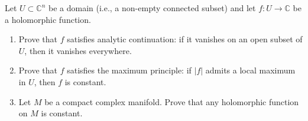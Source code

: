 \documentclass[12pt]{article}
\begin{document}




\begin{problem}{1}
    Let $U \subset \mathbb{C}^n$ be a domain (i.e., a non-empty connected subset) and let $f : U \to \mathbb{C}$ be a holomorphic function.
    \begin{enumerate}
        \item Prove that $f$ satisfies analytic continuation: if it vanishes on an open subset of $U$, then it vanishes everywhere.
        \item Prove that $f$ satisfies the maximum principle: if $|f|$ admits a local maximum in $U$, then $f$ is constant.
        \item Let $M$ be a compact complex manifold. Prove that any holomorphic function on $M$ is constant.
    \end{enumerate}    
\end{problem}
\end{document}
